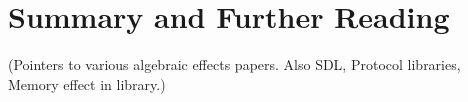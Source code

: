 \section{Summary and Further Reading}

(Pointers to various algebraic effects papers. Also SDL, Protocol libraries,
Memory effect in \effects{} library.)

